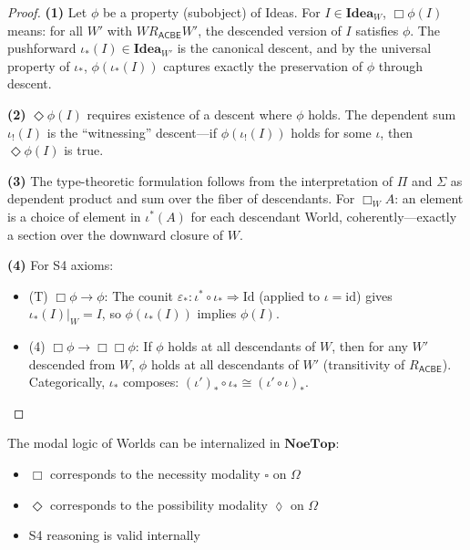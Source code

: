 \begin{proof}
\textbf{(1)} Let $\phi$ be a property (subobject) of Ideas. For $I \in \mathbf{Idea}_W$,
$\Box\phi(I)$ means: for all $W'$ with $W \mathrel{R_{\mathsf{ACBE}}} W'$, the descended
version of $I$ satisfies $\phi$. The pushforward $\iota_*(I) \in \mathbf{Idea}_{W'}$ is
the canonical descent, and by the universal property of $\iota_*$, $\phi(\iota_*(I))$
captures exactly the preservation of $\phi$ through descent.

\textbf{(2)} $\Diamond\phi(I)$ requires existence of a descent where $\phi$ holds.
The dependent sum $\iota_!(I)$ is the ``witnessing'' descent---if $\phi(\iota_!(I))$
holds for some $\iota$, then $\Diamond\phi(I)$ is true.

\textbf{(3)} The type-theoretic formulation follows from the interpretation of
$\Pi$ and $\Sigma$ as dependent product and sum over the fiber of descendants.
For $\Box_W A$: an element is a choice of element in $\iota^*(A)$ for each
descendant World, coherently---exactly a section over the downward closure of $W$.

\textbf{(4)} For S4 axioms:
\begin{itemize}
  \item (T) $\Box\phi \to \phi$: The counit $\varepsilon_* : \iota^* \circ \iota_* \Rightarrow \mathrm{Id}$
        (applied to $\iota = \mathrm{id}$) gives $\iota_*(I)|_W = I$, so $\phi(\iota_*(I))$
        implies $\phi(I)$.
  \item (4) $\Box\phi \to \Box\Box\phi$: If $\phi$ holds at all descendants of $W$,
        then for any $W'$ descended from $W$, $\phi$ holds at all descendants of $W'$
        (transitivity of $R_{\mathsf{ACBE}}$). Categorically, $\iota_*$ composes:
        $(\iota')_* \circ \iota_* \cong (\iota' \circ \iota)_*$.
\end{itemize}
\end{proof}

\begin{corollary}
\label{cor:modal-internal-topos}
The modal logic of Worlds can be internalized in $\mathbf{NoeTop}$:
\begin{itemize}
  \item $\Box$ corresponds to the necessity modality $\square$ on $\Omega$
  \item $\Diamond$ corresponds to the possibility modality $\lozenge$ on $\Omega$
  \item S4 reasoning is valid internally
\end{itemize}
\end{corollary}

